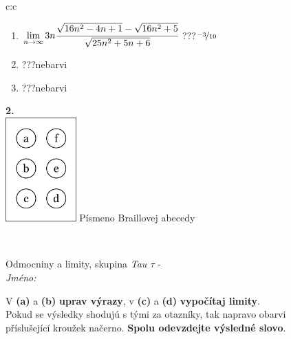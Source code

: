\documentclass[10pt]{report}
\begin{document}
\begin{tabular}{c:c}
\begin{minipage}[c][104.5mm][t]{0.5\linewidth}
\begin{center}
\begin{minipage}{0.79\linewidth}
\begin{center}
\begin{varwidth}{\linewidth}
\begin{enumerate}
\item $\lim\limits_{n\to\infty}3n\cfrac{\sqrt{16n^2-4n+1}-\sqrt{16n^2+5}}{\sqrt{25n^2+5n+6}}$\quad \dotfill\; ???\;\dotfill \quad $\nicefrac{-3}{10}$
\item \quad \dotfill\; ???\;\dotfill \quad nebarvi
\item \quad \dotfill\; ???\;\dotfill \quad nebarvi
\end{enumerate}
\end{varwidth}
\end{center}
\end{minipage}
\begin{minipage}{0.20\linewidth}
\begin{center}
{\Huge\bfseries 2.} \\[2mm]
\includegraphics[height=40mm]{../images/braille.png}
{\small Písmeno Braillovej abecedy}
\end{center}
\end{minipage}
\end{center}
\end{minipage}
\\ \hdashline
\begin{minipage}[c][104.5mm][t]{0.5\linewidth}
\begin{center}
\vspace{7mm}
{\huge Odmocniny a limity, skupina \textit{Tau $\tau$} -}\\[5mm]
\textit{Jméno:}\phantom{xxxxxxxxxxxxxxxxxxxxxxxxxxxxxxxxxxxxxxxxxxxxxxxxxxxxxxxxxxxxxxxxx}\\[5mm]
\begin{minipage}{0.95\linewidth}
\begin{center}
V \textbf{(a)} a \textbf{(b)} \textbf{uprav výrazy}, v \textbf{(c)} a \textbf{(d)} \textbf{vypočítaj limity}.\\Pokud se výsledky shodujú s tými za otazníky, tak napravo obarvi\\příslušející kroužek načerno. \textbf{Spolu odevzdejte výsledné slovo}.
\end{center}
\end{minipage}
\\[1mm]

\end{center}
\end{minipage}
\end{tabular}
\end{document}
